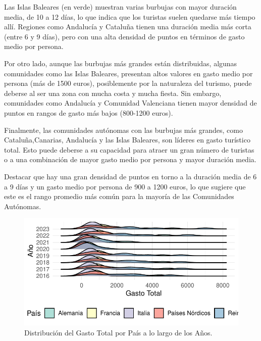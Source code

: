 \documentclass[data,article,submit,moreauthors,pdftex]{Definitions/mdpi}
\begin{document}
Las Islas Baleares (en verde) muestran varias burbujas con mayor duración media, de 10 a 12 días, lo que indica que los turistas suelen quedarse más tiempo allí. Regiones como Andalucía y Cataluña tienen una duración media más corta (entre 6 y 9 días), pero con una alta densidad de puntos en términos de gasto medio por persona.

Por otro lado, aunque las burbujas más grandes están distribuidas, algunas comunidades como las Islas Baleares, presentan altos valores en gasto medio por persona (más de 1500 euros), posiblemente por la naturaleza del turismo, puede deberse al ser una zona con mucha costa y mucha fiesta.
Sin embargo, comunidades como Andalucía y Comunidad Valenciana tienen mayor densidad de puntos en rangos de gasto más bajos (800-1200 euros).

Finalmente, las comunidades autónomas con las burbujas más grandes, como Cataluña,Canarias, Andalucía y las Islas Baleares, son líderes en gasto turístico total. Esto puede deberse a su capacidad para atraer un gran número de turistas o a una combinación de mayor gasto medio por persona y mayor duración media.

Destacar que hay una gran densidad de puntos en torno a la duración media de 6 a 9 días y un gasto medio por persona de 900 a 1200 euros, lo que sugiere que este es el rango promedio más común para la mayoría de las Comunidades Autónomas.\\

\begin{figure}[H]
\includegraphics{ProyectoAED2024_Rmd_files/figure-latex/unnamed-chunk-25-1} \caption{Distribución del Gasto Total por País a lo largo de los Años.\label{fig:ridgelineplot}}\label{fig:unnamed-chunk-25}
\end{figure}
\end{document}
